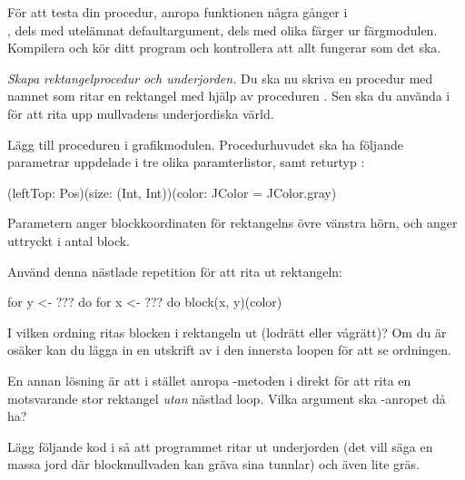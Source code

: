 
\Subtask
För att testa din procedur, anropa funktionen  några gånger i  \\, dels med utelämnat defaultargument, dels med olika färger ur färgmodulen. Kompilera och kör ditt program och kontrollera att allt fungerar som det ska.



\Task \emph{Skapa rektangelprocedur och underjorden.} Du ska nu skriva en procedur med namnet  som ritar en rektangel med hjälp av proceduren . Sen ska du använda  i  för att rita upp mullvadens underjordiska värld.

\Subtask
Lägg till proceduren  i grafikmodulen. Procedurhuvudet ska ha följande parametrar uppdelade i tre olika paramterlistor, samt returtyp :
\begin{Code}
(leftTop: Pos)(size: (Int, Int))(color: JColor = JColor.gray)
\end{Code}

Parametern  anger blockkoordinaten för rektangelns övre vänstra hörn, och  anger  uttryckt i antal block.

Använd denna nästlade repetition för att rita ut rektangeln:

\begin{Code}
for y <- ??? do
	for x <- ??? do
		block(x, y)(color)
\end{Code}

\Subtask\Pen
I vilken ordning ritas blocken i rektangeln ut (lodrätt eller vågrätt)? Om du är osäker kan du lägga in en utskrift av  i den innersta loopen för att se ordningen.

\Subtask\Pen En annan lösning är att i stället anropa -metoden i  direkt för att rita en motsvarande stor rektangel \emph{utan} nästlad loop. Vilka argument ska -anropet då ha?

\Subtask Lägg följande kod i  så att programmet ritar ut underjorden (det vill säga en massa jord där blockmullvaden kan gräva sina tunnlar) och även lite gräs.

